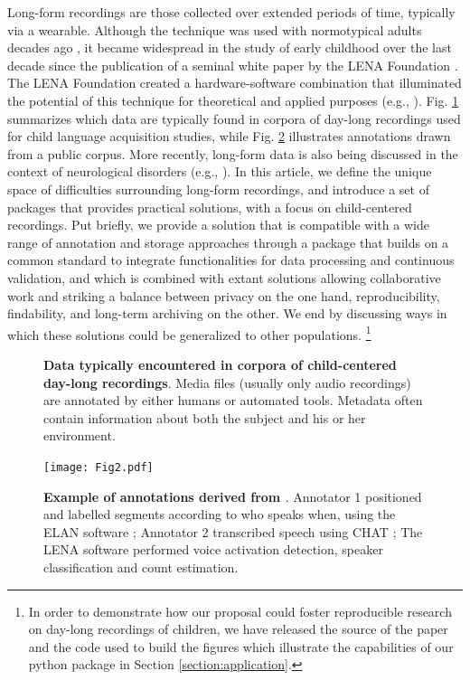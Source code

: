 \documentclass[smallextended]{svjour3}       %
\begin{document}
Long-form recordings are those collected over extended periods of time, typically via a wearable. Although the technique was used with normotypical adults decades ago \citep{ear1,ear2}, it became widespread in the study of early childhood over the last decade since the publication of a seminal white paper by the LENA Foundation \citep{gilkerson2008power}. The LENA Foundation created a hardware-software combination that illuminated the potential of this technique for theoretical and applied purposes (e.g., \citealt{christakis2009audible,warlaumont2014social}). Fig. \ref{fig:data} summarizes which data are typically found in corpora of day-long recordings used for child language acquisition studies, while Fig. \ref{fig:annotations} illustrates annotations drawn from a public corpus.
More recently, long-form data is also being discussed in the context of neurological disorders (e.g., \citealt{riad2020vocal}). In this article, we define the unique space of difficulties surrounding long-form recordings, and introduce a set of packages that provides practical solutions, with a focus on child-centered recordings. Put briefly, we provide a solution that is compatible with a wide range of annotation and storage approaches through a package that builds on a common standard to integrate functionalities for data processing and continuous validation, and which is combined with extant solutions allowing collaborative work and striking a balance between privacy on the one hand, reproducibility, findability, and long-term archiving on the other.  We end by discussing ways in which these solutions could be generalized to other populations. \footnote{In order to demonstrate how our proposal could foster reproducible research on day-long recordings of children, we have released the source of the paper and the code used to build the figures which illustrate the capabilities of our python package in Section \ref{section:application}.}

\begin{figure}
    \centering
    
    \caption{\textbf{Data typically encountered in corpora of child-centered day-long recordings}. Media files (usually only audio recordings) are annotated by either humans or automated tools. Metadata often contain information about both the subject and his or her environment.}
    \label{fig:data}
\end{figure}
    
\begin{figure}
    \centering
    \texttt{[image: Fig2.pdf]}
    \caption{\label{fig:annotations}\textbf{Example of annotations derived from \cite{vandam-day}}. Annotator 1 positioned and labelled segments according to who speaks when, using the ELAN software \citep{wittenburg2006elan}; Annotator 2 transcribed speech using CHAT \citep{MacWhinney2000}; The LENA software \citep{gilkerson2008power} performed voice activation detection, speaker classification and count estimation.}
\end{figure}
\end{document}

